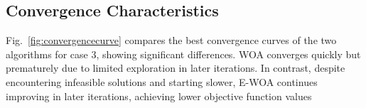 \documentclass[conference]{IEEEtran}
\begin{document}
\subsection{Convergence Characteristics}

Fig.~\ref{fig:convergencecurve} compares the best convergence curves of the two algorithms for case 3, showing significant differences. WOA converges quickly but prematurely due to limited exploration in later iterations. In contrast, despite encountering infeasible solutions and starting slower, E-WOA continues improving in later iterations, achieving lower objective function values

\begin{table}[htbp]
	\caption{Optimization Results for Multiple DGs in IEEE 33-Bus System at Unity Power Factor}
	\vspace{-20pt}
	\begin{center}
\end{center}
\end{table}
\end{document}
